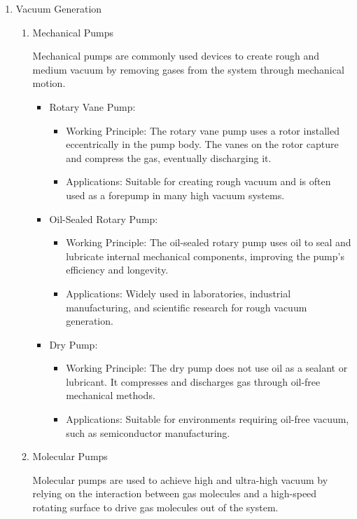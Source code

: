 \begin{enumerate}
\begin{enumerate}
		\item Vacuum Generation
		\begin{enumerate}
			\item Mechanical Pumps
			
			Mechanical pumps are commonly used devices to create rough and medium vacuum by removing gases from the system through mechanical motion.
			
			\begin{itemize}
				\item Rotary Vane Pump:
				\begin{itemize}
					\item Working Principle: The rotary vane pump uses a rotor installed eccentrically in the pump body. The vanes on the rotor capture and compress the gas, eventually discharging it.
					\item Applications: Suitable for creating rough vacuum and is often used as a forepump in many high vacuum systems.
				\end{itemize}
				
				\item Oil-Sealed Rotary Pump:
				\begin{itemize}
					\item Working Principle: The oil-sealed rotary pump uses oil to seal and lubricate internal mechanical components, improving the pump's efficiency and longevity.
					\item Applications: Widely used in laboratories, industrial manufacturing, and scientific research for rough vacuum generation.
				\end{itemize}
				
				\item Dry Pump:
				\begin{itemize}
					\item Working Principle: The dry pump does not use oil as a sealant or lubricant. It compresses and discharges gas through oil-free mechanical methods.
					\item Applications: Suitable for environments requiring oil-free vacuum, such as semiconductor manufacturing.
				\end{itemize}
			\end{itemize}
			
			\item Molecular Pumps
			
			Molecular pumps are used to achieve high and ultra-high vacuum by relying on the interaction between gas molecules and a high-speed rotating surface to drive gas molecules out of the system.
			

\end{enumerate}
\end{enumerate}
\end{enumerate}
